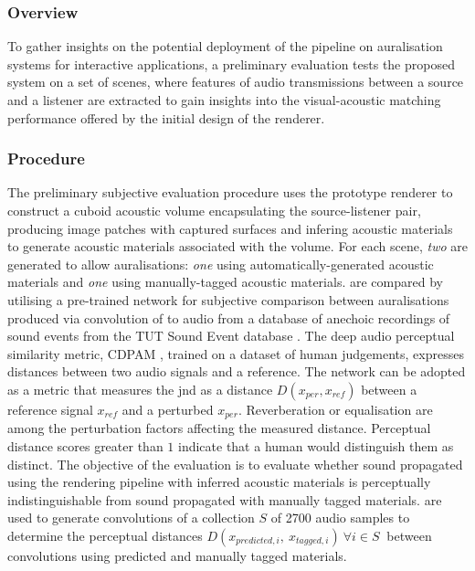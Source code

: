 \subsubsection{Overview}
To gather insights on the potential deployment of the pipeline on auralisation systems for interactive applications, a preliminary evaluation tests the proposed system on a set of scenes, where features of audio transmissions between a source and a listener are extracted to gain insights into the visual-acoustic matching performance offered by the initial design of the renderer. \par

\subsubsection{Procedure}
The preliminary subjective evaluation procedure uses the prototype renderer to construct a cuboid acoustic volume encapsulating the source-listener pair, producing image patches with captured surfaces and infering acoustic materials to generate acoustic materials associated with the volume. For each scene, \emph{two}  are generated to allow auralisations: \emph{one} using automatically-generated acoustic materials and \emph{one} using manually-tagged acoustic materials.  are compared by utilising a pre-trained network for subjective comparison between auralisations produced via convolution of  to audio from a database of anechoic recordings of sound events from the TUT Sound Event database \citep{sharath_adavanne_2018_1237752}. The deep audio perceptual similarity metric, CDPAM \citep{manocha2021cdpam}, trained on a dataset of human judgements, expresses distances between two audio signals and a reference. The network can be adopted as a metric that measures the \acrfull{jnd} as a distance $D(x_{per}, x_{ref})$ between a reference signal $x_{ref}$ and a perturbed $x_{per}$. Reverberation or equalisation are among the perturbation factors affecting the measured distance. Perceptual distance scores greater than $1$ indicate that a human would distinguish them as distinct. The objective of the evaluation is to evaluate whether sound propagated using the rendering pipeline with inferred acoustic materials is perceptually indistinguishable from sound propagated with manually tagged materials.  are used to generate convolutions of a collection $S$ of 2700 audio samples to determine the perceptual distances $D(x_{predicted, i},~x_{tagged, i})~\forall i \in S~$ between convolutions using predicted and manually tagged materials.\par

